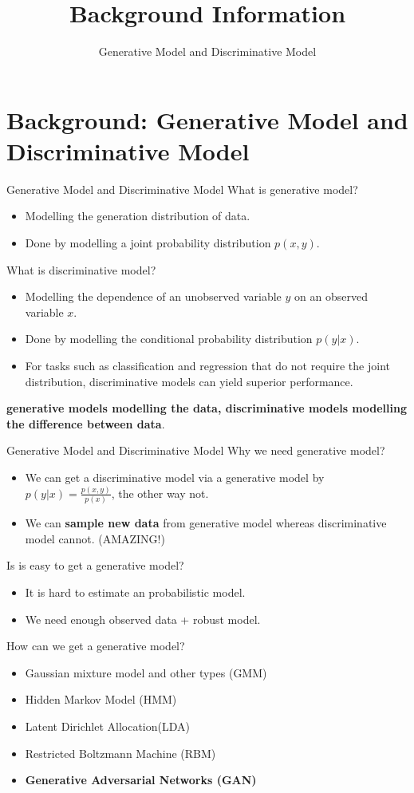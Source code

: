 \documentclass[10pt]{beamer}
\newcommand{\subtitlepage}[3]{\title{#1}\subtitle{#2}\author{#3}\date{}\begin{frame}[plain]\titlepage\end{frame}}
\begin{document}
	\part{Background: Generative Model and Discriminative Model}
	\subtitlepage{Background Information}{Generative Model and Discriminative Model}{}
	\begin{frame}{Generative Model and Discriminative Model}
		What is generative model?
		\begin{itemize}
			\item Modelling the generation distribution of data.
			\item Done by modelling a joint probability distribution $p(x, y)$.
		\end{itemize}
		What is discriminative model?
		\begin{itemize}
			\item Modelling the dependence of an unobserved variable $y$ on an observed variable $x$.
			\item Done by modelling the conditional probability distribution $p(y|x)$.
			\item For tasks such as classification and regression that do not require the joint distribution, discriminative models can yield superior performance.
		\end{itemize}
		
		\textbf{generative models modelling the data, discriminative models modelling the difference between data}.
	\end{frame}

	\begin{frame}{Generative Model and Discriminative Model}
		Why we need generative model?
		\begin{itemize}
			\item We can get a discriminative model via a generative model by $p(y|x)=\frac{p(x, y)}{p(x)}$, the other way not. 
			\item We can \textbf{sample new data} from generative model whereas discriminative model cannot. (AMAZING!)
		\end{itemize}
		Is is easy to get a generative model?
		\begin{itemize}
			\item It is hard to estimate an probabilistic model.
			\item We need enough observed data + robust model.
		\end{itemize}
		How can we get a generative model?
		\begin{itemize}
			\item Gaussian mixture model and other types (GMM)
			\item Hidden Markov Model (HMM)
			\item Latent Dirichlet Allocation(LDA)
			\item Restricted Boltzmann Machine (RBM)
			\item \textbf{Generative Adversarial Networks (GAN)}
		\end{itemize}
	\end{frame}
\end{document}
